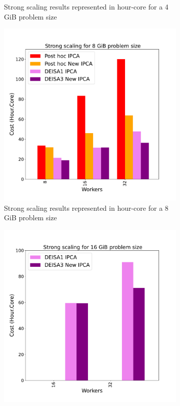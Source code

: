 \begin{figure}[h]
\begin{subfigure}[b]{0.4\textwidth}
         \caption{Strong scaling results represented in hour-core for a 4\,GiB problem size}
         \label{fig:AD4}
     \end{subfigure}
     \vfill
     \begin{subfigure}[b]{0.4\textwidth}
         \centering
         \includegraphics[width=\textwidth, height=\textwidth]{figures/AD8_1vs3vspost1vspost2.pdf}
         \caption{Strong scaling results represented in hour-core for a 8\,GiB problem size}
         \label{fig:AD8}
     \end{subfigure}
     \hfill
     \begin{subfigure}[b]{0.4\textwidth}
         \centering
         \includegraphics[width=\textwidth, height=\textwidth]{figures/AD16_1vs3vspost1vspost2.pdf}

\end{subfigure}
\end{figure}

